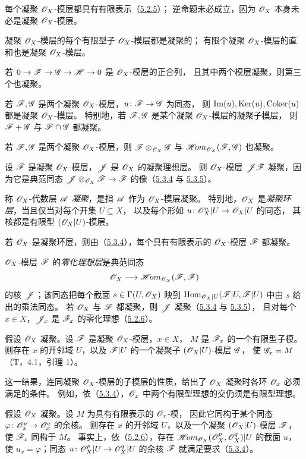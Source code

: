 每个凝聚 $\mathscr O_X$-模层都具有有限表示（\hyperlink{para:0:5.2.5}{5.2.5}）；
逆命题未必成立，因为 $\mathscr O_X$ 本身未必是凝聚 $\mathscr O_X$-模层。

凝聚 $\mathscr O_X$-模层的每个有限型子 $\mathscr O_X$-模层都是凝聚的；
有限个凝聚 $\mathscr O_X$-模层的直和也是凝聚 $\mathscr O_X$-模层。

若 $0\to\mathscr F\to\mathscr G\to\mathscr H\to0$ 是 $\mathscr O_X$-模层的正合列，
且其中两个模层凝聚，则第三个也凝聚。

若 $\mathscr F,\mathscr G$ 是两个凝聚 $\mathscr O_X$-模层，$u\colon\mathscr F\to\mathscr G$ 为同态，
则 $\operatorname{Im}(u),\operatorname{Ker}(u),\operatorname{Coker}(u)$ 都是凝聚 $\mathscr O_X$-模层。
特别地，若 $\mathscr F,\mathscr G$ 是某个凝聚 $\mathscr O_X$-模层的凝聚子模层，
则 $\mathscr F+\mathscr G$ 与 $\mathscr F\cap\mathscr G$ 都凝聚。

若 $\mathscr F,\mathscr G$ 是两个凝聚 $\mathscr O_X$-模层，则
$\mathscr F\otimes_{\mathscr O_X}\mathscr G$ 与 $\mathscr{H}\!om_{\mathscr O_X}(\mathscr F,\mathscr G)$ 也凝聚。

设 $\mathscr F$ 是凝聚 $\mathscr O_X$-模层，$\mathscr J$ 是 $\mathscr O_X$ 的凝聚理想层。
则 $\mathscr O_X$-模层 $\mathscr J\mathscr F$ 凝聚，因为它是典范同态
$\mathscr J\otimes_{\mathscr O_X}\mathscr F\to\mathscr F$ 的像（\hyperlink{para:0:5.3.4}{5.3.4} 与 \hyperlink{para:0:5.3.5}{5.3.5}）。

称 $\mathscr O_X$-代数层 $\mathscr A$ \emph{凝聚}，是指 $\mathscr A$ 作为 $\mathscr O_X$-模层凝聚。
特别地，$\mathscr O_X$ 是\emph{凝聚环层}，当且仅当对每个开集 $U\subseteq X$，
以及每个形如 $u\colon\mathscr O_X^n|U\to\mathscr O_X|U$ 的同态，
其核都是有限型 $(\mathscr O_X|U)$-模层。

若 $\mathscr O_X$ 是凝聚环层，则由（\hyperlink{para:0:5.3.4}{5.3.4}），每个具有有限表示的 $\mathscr O_X$-模层 $\mathscr F$ 都凝聚。

$\mathscr O_X$-模层 $\mathscr F$ 的\emph{零化理想层}是典范同态
\[
 \mathscr O_X\longrightarrow\mathscr{H}\!om_{\mathscr O_X}(\mathscr F,\mathscr F)
\]
的核 $\mathscr J$；该同态把每个截面 $s\in\Gamma(U,\mathscr O_X)$ 映到
$\operatorname{Hom}_{\mathscr O_X|U}(\mathscr F|U,\mathscr F|U)$ 中由 $s$ 给出的乘法同态。
若 $\mathscr O_X$ 与 $\mathscr F$ 都凝聚，则 $\mathscr J$ 凝聚（\hyperlink{para:0:5.3.4}{5.3.4} 与 \hyperlink{para:0:5.3.5}{5.3.5}），
且对每个 $x\in X$，$\mathscr J_x$ 是 $\mathscr F_x$ 的零化理想（\hyperlink{para:0:5.2.6}{5.2.6}）。

假设 $\mathscr O_X$ 凝聚。设 $\mathscr F$ 是凝聚 $\mathscr O_X$-模层，$x\in X$，
$M$ 是 $\mathscr F_x$ 的一个有限型子模。
则存在 $x$ 的开邻域 $U$，以及 $\mathscr F|U$ 的一个凝聚子 $(\mathscr O_X|U)$-模层 $\mathscr G$，
使 $\mathscr G_x=M$（T，4.1，引理 1）。

这一结果，连同凝聚 $\mathscr O_X$-模层的子模层的性质，给出了 $\mathscr O_X$ 凝聚时各环 $\mathscr O_x$ 必须满足的条件。
例如，依（\hyperlink{para:0:5.3.4}{5.3.4}），$\mathscr O_x$ 中两个有限型理想的交仍须是有限型理想。

假设 $\mathscr O_X$ 凝聚。设 $M$ 为具有有限表示的 $\mathscr O_x$-模，
因此它同构于某个同态 $\varphi\colon\mathscr O_x^p\to\mathscr O_x^q$ 的余核。
则存在 $x$ 的开邻域 $U$，以及一个凝聚 $(\mathscr O_X|U)$-模层 $\mathscr F$，使 $\mathscr F_x$ 同构于 $M$。
事实上，依（\hyperlink{para:0:5.2.6}{5.2.6}），存在 $\mathscr{H}\!om_{\mathscr O_X}(\mathscr O_X^p,\mathscr O_X^q)|U$ 的截面 $u$，
使 $u_x=\varphi$；同态 $u\colon\mathscr O_X^p|U\to\mathscr O_X^q|U$ 的余核 $\mathscr F$ 就满足要求（\hyperlink{para:0:5.3.4}{5.3.4}）。


